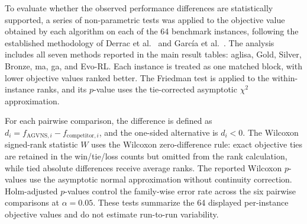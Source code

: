 \documentclass[pdflatex]{sn-jnl}
\begin{document}


To evaluate whether the observed performance differences are statistically
supported, a series of non-parametric tests was applied to the objective
value obtained by each algorithm on each of the 64 benchmark instances,
following the established methodology of Derrac
et al.~\cite{DERRAC20113} and Garc\'{i}a et al.~\cite{GARCIA20102044}.
The analysis includes all seven methods reported in the main result tables:
\gls{aglisa}, Gold, Silver, Bronze, \gls{ma}, \gls{ga}, and Evo-RL. Each
instance is treated as one matched block, with lower objective values ranked
better. The Friedman test is applied to the within-instance ranks, and its
$p$-value uses the tie-corrected asymptotic $\chi^2$ approximation.

For each pairwise comparison, the difference is defined as
$d_i = f_{\mathrm{AGVNS},i} - f_{\mathrm{competitor},i}$, and the one-sided
alternative is $d_i < 0$. The Wilcoxon signed-rank statistic $W$ uses the
Wilcoxon zero-difference rule: exact objective ties are retained in the
win/tie/loss counts but omitted from the rank calculation, while tied absolute
differences receive average ranks. The reported Wilcoxon $p$-values use the
asymptotic normal approximation without continuity correction. Holm-adjusted
$p$-values control the family-wise error rate across the six pairwise
comparisons at $\alpha = 0.05$. These tests summarize the 64 displayed
per-instance objective values and do not estimate run-to-run variability.
\end{document}
